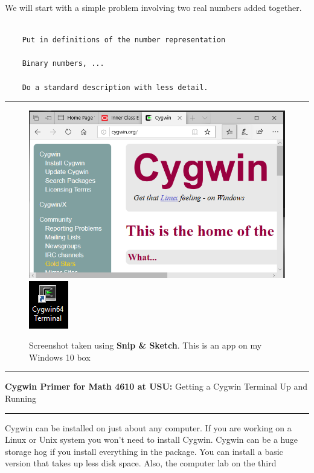 \documentclass[10pt,fleqn]{article}
\begin{document}
We will start with a simple problem involving two real numbers added together.

\begin{verbatim}

    Put in definitions of the number representation 

    Binary numbers, ...

    Do a standard description with less detail.

\end{verbatim}

\vskip0.1in\hrule\vskip0.1in
\vfill
\begin{figure}[h]
\centering
\includegraphics{./images/cygwin_00.png}
\vskip0.1in
\includegraphics{./images/cygwin_icon.png}
\caption{{Screenshot} taken using {\bf Snip \& Sketch}. This is an app on
         my Windows 10 box}
\end{figure}
\eject
\vskip0.1in\hrule\vskip0.1in
\noindent
{{\bf Cygwin Primer for Math 4610 at USU:} Getting a Cygwin Terminal Up and
   Running} 
\vskip0.1in\hrule\vskip0.1in
\noindent
Cygwin can be installed on just about any computer. If you are working on a
Linux or Unix system you won't need to install Cygwin. Cygwin can be a huge
storage hog if you install everything in the package. You can install a basic
version that takes up less disk space. Also, the computer lab on the third
\end{document}
